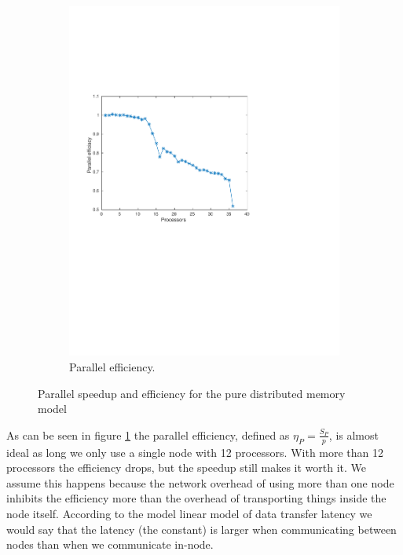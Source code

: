 \begin{figure}
\begin{subfigure}[b]{0.45\textwidth}
			\includegraphics[width=\textwidth]{./figures/efficiacy}
			\caption{Parallel efficiency.}
			\label{fig:efficiacy}
        \end{subfigure}%
        \caption{Parallel speedup and efficiency for the pure distributed memory model}
        \label{fig:analysis}
\end{figure}

As can be seen in figure \ref{fig:efficiacy} the parallel efficiency, defined as $\eta_P=\frac{S_P}{p}$, is almost ideal as long we only use a single node with 12 processors. With more than 12 processors the efficiency drops, but the speedup still makes it worth it. We assume this happens because the network overhead of using more than one node inhibits the efficiency more than the overhead of transporting things inside the node itself. According to the model linear model of data transfer latency we would say that the latency (the constant) is larger when communicating between nodes than when we communicate in-node.



